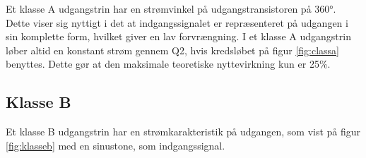 Et klasse A udgangstrin har en strømvinkel på udgangstransistoren på 360°. Dette viser sig nyttigt i det at indgangssignalet er repræsenteret på udgangen i sin komplette form, hvilket giver en lav forvrængning.
I et klasse A udgangstrin løber altid en konstant strøm gennem Q2, hvis kredsløbet på figur \ref{fig:classa} benyttes. Dette gør at den maksimale teoretiske nyttevirkning kun er 25\%. \cite{sedra-smith}%

\subsection{Klasse B}

Et klasse B udgangstrin har en strømkarakteristik på udgangen, som vist på figur \ref{fig:klasseb} med en sinustone, som indgangssignal. 

